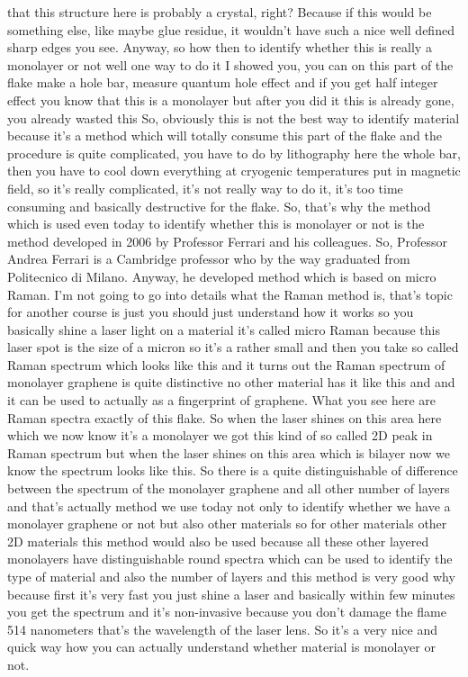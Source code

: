 that this structure here is probably a crystal, right? Because if this would be something else, like maybe glue residue, it wouldn't have such a nice well defined sharp edges you see. Anyway, so how then to identify whether this is really a monolayer or not well one way to do it I showed you, you can on this part of the flake make a hole bar, measure quantum hole effect and if you get half integer effect you know that this is a monolayer but after you did it this is already gone, you already wasted this So, obviously this is not the best way to identify material because it's a method which will totally consume this part of the flake and the procedure is quite complicated, you have to do by lithography here the whole bar, then you have to cool down everything at cryogenic temperatures put in magnetic field, so it's really complicated, it's not really way to do it, it's too time consuming and basically destructive for the flake.
So, that's why the method which is used even today to identify whether this is monolayer or not is the method developed in 2006 by Professor Ferrari and his colleagues. So, Professor Andrea Ferrari is a Cambridge professor who by the way graduated from Politecnico di Milano. Anyway, he developed method which is based on micro Raman. I'm not going to go into details what the Raman method is, that's topic for another course is just you should just understand how it works so you basically shine a laser light on a material it's called micro Raman because this laser spot is the size of a micron so it's a rather small and then you take so called Raman spectrum which looks like this and it turns out the Raman spectrum of monolayer graphene is quite distinctive no other material has it like this and and it can be used to actually as a fingerprint of graphene. What you see here are Raman spectra exactly of this flake. So when the laser shines on this area here which we now know it's a monolayer we got this kind of so called 2D peak in Raman spectrum but when the laser shines on this area which is bilayer now we know the spectrum looks like this. So there is a quite distinguishable of difference between the spectrum of the monolayer graphene and all other number of layers and that's actually method we use today not only to identify whether we have a monolayer graphene or not but also other materials so for other materials other 2D materials this method would also be used because all these other layered monolayers have distinguishable round spectra which can be used to identify the type of material and also the number of layers and this method is very good why because first it's very fast you just shine a laser and basically within few minutes you get the spectrum and it's non-invasive because you don't damage the flame 514 nanometers that's the wavelength of the laser lens. So it's a very nice and quick way how you can actually understand whether material is monolayer or not.
